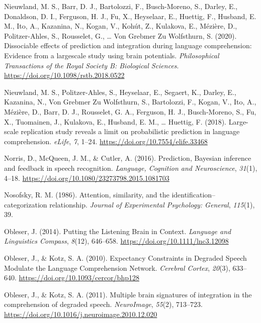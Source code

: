 \documentclass[a4paper, nobind]{templates/ociamthesis}
\newlength{\cslhangindent}
\newenvironment{CSLReferences}[2] %
 {%
  \setlength{\parindent}{0pt}
  \ifodd #1
  \let\oldpar\par
  \def\par{\hangindent=\cslhangindent\oldpar}
  \fi
  \setlength{\parskip}{1mm}
  \setlength{\baselineskip}{6mm}
 }%
 {}
\begin{document}
\begin{CSLReferences}{1}{0}
\leavevmode{}%
Nieuwland, M. S., Barr, D. J., Bartolozzi, F., Busch-Moreno, S., Darley, E., Donaldson, D. I., Ferguson, H. J., Fu, X., Heyselaar, E., Huettig, F., Husband, E. M., Ito, A., Kazanina, N., Kogan, V., Kohút, Z., Kulakova, E., Mézière, D., Politzer-Ahles, S., Rousselet, G., \ldots{} Von Grebmer Zu Wolfsthurn, S. (2020). {Dissociable effects of prediction and integration during language comprehension: Evidence from a largescale study using brain potentials}. \emph{Philosophical Transactions of the Royal Society B: Biological Sciences}. \url{https://doi.org/10.1098/rstb.2018.0522}

\leavevmode{}%
Nieuwland, M. S., Politzer-Ahles, S., Heyselaar, E., Segaert, K., Darley, E., Kazanina, N., Von Grebmer Zu Wolfsthurn, S., Bartolozzi, F., Kogan, V., Ito, A., Mézière, D., Barr, D. J., Rousselet, G. A., Ferguson, H. J., Busch-Moreno, S., Fu, X., Tuomainen, J., Kulakova, E., Husband, E. M., \ldots{} Huettig, F. (2018). {Large-scale replication study reveals a limit on probabilistic prediction in language comprehension}. \emph{eLife}, \emph{7}, 1--24. \url{https://doi.org/10.7554/elife.33468}

\leavevmode{}%
Norris, D., McQueen, J. M., \& Cutler, A. (2016). {Prediction, Bayesian inference and feedback in speech recognition}. \emph{Language, Cognition and Neuroscience}, \emph{31}(1), 4--18. \url{https://doi.org/10.1080/23273798.2015.1081703}

\leavevmode{}%
Nosofsky, R. M. (1986). Attention, similarity, and the identification--categorization relationship. \emph{Journal of Experimental Psychology: General}, \emph{115}(1), 39.

\leavevmode{}%
Obleser, J. (2014). Putting the Listening Brain in Context. \emph{Language and Linguistics Compass}, \emph{8}(12), 646--658. \url{https://doi.org/10.1111/lnc3.12098}

\leavevmode{}%
Obleser, J., \& Kotz, S. A. (2010). Expectancy Constraints in Degraded Speech Modulate the Language Comprehension Network. \emph{Cerebral Cortex}, \emph{20}(3), 633--640. \url{https://doi.org/10.1093/cercor/bhp128}

\leavevmode{}%
Obleser, J., \& Kotz, S. A. (2011). Multiple brain signatures of integration in the comprehension of degraded speech. \emph{NeuroImage}, \emph{55}(2), 713--723. \url{https://doi.org/10.1016/j.neuroimage.2010.12.020}


\end{CSLReferences}
\end{document}
